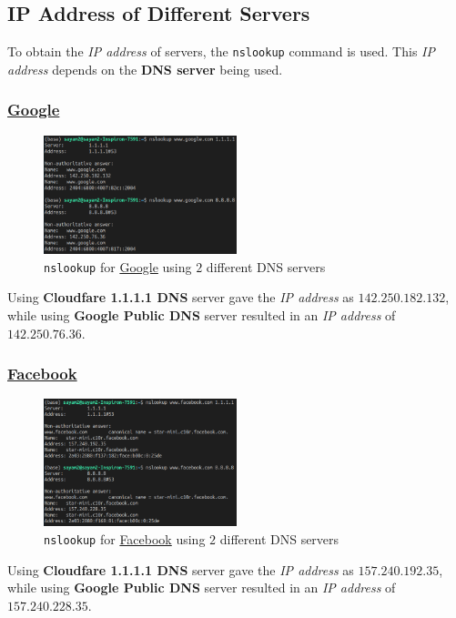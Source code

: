 \documentclass[11pt]{article}
\begin{document}
\subsection{IP Address of Different Servers}
To obtain the \textit{IP address} of servers, the \texttt{nslookup} command is used. This \textit{IP address} depends on the \textbf{DNS server} being used.

\subsubsection{\href{https://www.google.com}{Google}}
\begin{figure}[H]
    \centering
    \includegraphics[width=0.5\textwidth]{nslookup_google.png}
    \caption{\texttt{nslookup} for \href{https://www.google.com}{Google} using $2$ different DNS servers}
\end{figure}
Using \textbf{Cloudfare 1.1.1.1 DNS} server gave the \textit{IP address} as $142.250.182.132$, while using \textbf{Google Public DNS} server resulted in an \textit{IP address} of $142.250.76.36$.

\subsubsection{\href{https://www.facebook.com}{Facebook}}
\begin{figure}[H]
    \centering
    \includegraphics[width=0.5\textwidth]{nslookup_facebook.png}
    \caption{\texttt{nslookup} for \href{https://www.facebook.com}{Facebook} using $2$ different DNS servers}
\end{figure}
Using \textbf{Cloudfare 1.1.1.1 DNS} server gave the \textit{IP address} as $157.240.192.35$, while using \textbf{Google Public DNS} server resulted in an \textit{IP address} of $157.240.228.35$.
\end{document}
